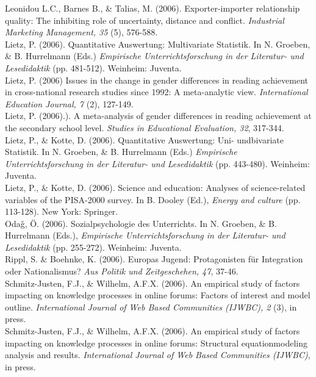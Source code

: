 Leonidou L.C., Barnes B., \& Talias, M. (2006). Exporter-importer relationship quality: The inhibiting role of uncertainty, distance and conflict. \textit{Industrial Marketing Management, 35 }(5), 576-588.\\

Lietz, P. (2006). Quantitative Auswertung: Multivariate Statistik. In N. Groeben, \& B. Hurrelmann (Eds.) \textit{Empirische Unterrichtsforschung in der Literatur- und Lesedidaktik }(pp. 481-512). Weinheim: Juventa.\\

Lietz, P. (2006) Issues in the change in gender differences in reading achievement in cross-national research studies since 1992: A meta-analytic view. \textit{International Education Journal, 7} (2), 127-149.\\

Lietz, P. (2006).). A meta-analysis of gender differences in reading achievement at the secondary school level. \textit{Studies in Educational Evaluation, 32}, 317-344.\\

Lietz, P., \& Kotte, D. (2006). Quantitative Auswertung: Uni- undbivariate Statistik. In N. Groeben, \& B. Hurrelmann (Eds.) \textit{Empirische Unterrichtsforschung in der Literatur- und Lesedidaktik }(pp. 443-480). Weinheim: Juventa.\\

Lietz, P., \& Kotte, D. (2006). Science and education: Analyses of science-related variables of the PISA-2000 survey. In B. Dooley (Ed.), \textit{Energy and culture }(pp. 113-128). New York: Springer.\\

Oda\v{g}, \"{O}. (2006). Sozialpsychologie des Unterrichts. In N. Groeben, \& B. Hurrelmann (Eds.), \textit{Empirische Unterrichtsforschung in der Literatur- und Lesedidaktik }(pp. 255-272). Weinheim: Juventa.\\

Rippl, S. \& Boehnke, K. (2006). Europas Jugend: Protagonisten f\"{u}r Integration oder Nationalismus? \textit{Aus Politik und Zeitgeschehen, 47}, 37-46.\\

Schmitz-Justen, F.J., \& Wilhelm, A.F.X. (2006). An empirical study of factors impacting on knowledge processes in online forums: Factors of interest and model outline. \textit{International Journal of Web Based Communities (IJWBC), 2} (3), in press.\\

Schmitz-Justen, F.J., \& Wilhelm, A.F.X. (2006). An empirical study of factors impacting on knowledge processes in online forums: Structural equationmodeling analysis and results. \textit{International Journal of Web Based Communities (IJWBC)}, in press.\\

